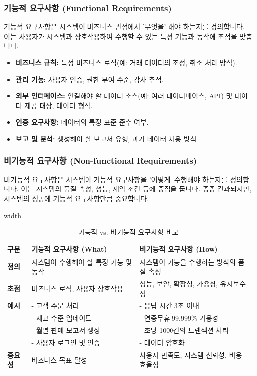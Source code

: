 \documentclass[11pt,a4paper]{article}
\begin{document}
\subsubsection{기능적 요구사항 (Functional Requirements)}
기능적 요구사항은 시스템이 비즈니스 관점에서 '무엇을' 해야 하는지를 정의합니다. 이는 사용자가 시스템과 상호작용하여 수행할 수 있는 특정 기능과 동작에 초점을 맞춥니다.

\begin{itemize}
    \item \textbf{비즈니스 규칙:} 특정 비즈니스 로직(예: 거래 데이터의 조정, 취소 처리 방식).
    \item \textbf{관리 기능:} 사용자 인증, 권한 부여 수준, 감사 추적.
    \item \textbf{외부 인터페이스:} 연결해야 할 데이터 소스(예: 여러 데이터베이스, API) 및 데이터 제공 대상, 데이터 형식.
    \item \textbf{인증 요구사항:} 데이터의 특정 표준 준수 여부.
    \item \textbf{보고 및 분석:} 생성해야 할 보고서 유형, 과거 데이터 사용 방식.
\end{itemize}

\subsubsection{비기능적 요구사항 (Non-functional Requirements)}
비기능적 요구사항은 시스템이 기능적 요구사항을 '어떻게' 수행해야 하는지를 정의합니다. 이는 시스템의 품질 속성, 성능, 제약 조건 등에 중점을 둡니다. 종종 간과되지만, 시스템의 성공에 기능적 요구사항만큼 중요합니다.

\begin{table}[h!]
\centering
\caption{기능적 vs. 비기능적 요구사항 비교}
\label{tab:functional_vs_nonfunctional}
\begin{adjustbox}{width=\textwidth}
\begin{tabular}{p{}p{}p{}}
\toprule
\textbf{구분} & \textbf{기능적 요구사항 (What)} & \textbf{비기능적 요구사항 (How)} \\
\midrule
\textbf{정의} & 시스템이 수행해야 할 특정 기능 및 동작 & 시스템이 기능을 수행하는 방식의 품질 속성 \\
\textbf{초점} & 비즈니스 로직, 사용자 상호작용 & 성능, 보안, 확장성, 가용성, 유지보수성 \\
\textbf{예시} & - 고객 주문 처리 & - 응답 시간 3초 이내 \\
& - 재고 수준 업데이트 & - 연중무휴 99.999\% 가용성 \\
& - 월별 판매 보고서 생성 & - 초당 1000건의 트랜잭션 처리 \\
& - 사용자 로그인 및 인증 & - 데이터 암호화 \\
\textbf{중요성} & 비즈니스 목표 달성 & 사용자 만족도, 시스템 신뢰성, 비용 효율성 \\
\bottomrule
\end{tabular}
\end{adjustbox}
\end{table}
\end{document}
